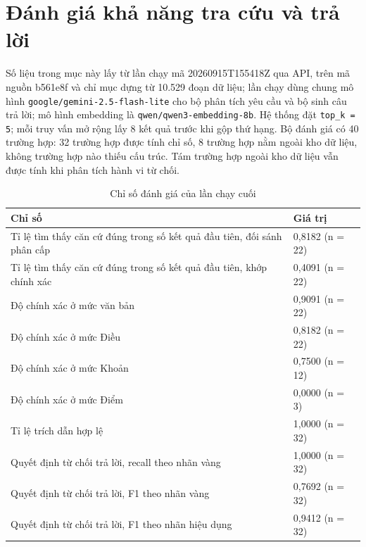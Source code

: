 \documentclass[12pt,a4paper,oneside]{report}
\begin{document}
\section{Đánh giá khả năng tra cứu và trả lời}
Số liệu trong mục này lấy từ lần chạy mã 20260915T155418Z qua API, trên mã nguồn b561e8f và chỉ mục dựng từ 10.529 đoạn dữ liệu; lần chạy dùng chung mô hình \texttt{google/\allowbreak gemini-2.5-flash-lite} cho bộ phân tích yêu cầu và bộ sinh câu trả lời; mô hình embedding là \texttt{qwen/\allowbreak qwen3-embedding-8b}. Hệ thống đặt \texttt{top\_k = 5}; mỗi truy vấn mở rộng lấy 8 kết quả trước khi gộp thứ hạng. Bộ đánh giá có 40 trường hợp: 32 trường hợp được tính chỉ số, 8 trường hợp nằm ngoài kho dữ liệu, không trường hợp nào thiếu cấu trúc. Tám trường hợp ngoài kho dữ liệu vẫn được tính khi phân tích hành vi từ chối.
\begin{table}[H]
  \caption{Chỉ số đánh giá của lần chạy cuối}
  \label{tab:evaluation-status}
  \centering
  \begin{tabularx}{\textwidth}{|L{6.0cm}|Z|}
    \hline
    \textbf{Chỉ số}                                                         & \textbf{Giá trị} \\
    \hline
    Tỉ lệ tìm thấy căn cứ đúng trong số kết quả đầu tiên, đối sánh phân cấp & 0,8182 (n = 22)  \\
    \hline
    Tỉ lệ tìm thấy căn cứ đúng trong số kết quả đầu tiên, khớp chính xác    & 0,4091 (n = 22)  \\
    \hline
    Độ chính xác ở mức văn bản                                              & 0,9091 (n = 22)  \\
    \hline
    Độ chính xác ở mức Điều                                                 & 0,8182 (n = 22)  \\
    \hline
    Độ chính xác ở mức Khoản                                                & 0,7500 (n = 12)  \\
    \hline
    Độ chính xác ở mức Điểm                                                 & 0,0000 (n = 3)   \\
    \hline
    Tỉ lệ trích dẫn hợp lệ                                                  & 1,0000 (n = 32)  \\
    \hline
    Quyết định từ chối trả lời, recall theo nhãn vàng                       & 1,0000 (n = 32)  \\
    \hline
    Quyết định từ chối trả lời, F1 theo nhãn vàng                           & 0,7692 (n = 32)  \\
    \hline
    Quyết định từ chối trả lời, F1 theo nhãn hiệu dụng                      & 0,9412 (n = 32)  \\
    \hline
  \end{tabularx}
\end{table}
\end{document}
